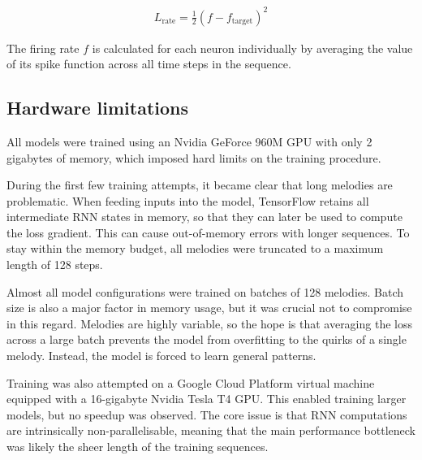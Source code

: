 \documentclass[../../report.tex]{subfiles}
\begin{document}
\begin{align*}
  L_\mathrm{rate} = \frac{1}{2} (f - f_\mathrm{target})^2
\end{align*}

The firing rate \(f\) is calculated for each neuron individually by averaging
the value of its spike function across all time steps in the sequence.

\subsection{Hardware limitations}

All models were trained using an Nvidia GeForce 960M GPU with only 2 gigabytes
of memory, which imposed hard limits on the training procedure.

During the first few training attempts, it became clear that long melodies are
problematic. When feeding inputs into the model, TensorFlow retains all
intermediate RNN states in memory, so that they can later be used to compute the
loss gradient. This can cause out-of-memory errors with longer sequences. To
stay within the memory budget, all melodies were truncated to a maximum length
of 128 steps.

Almost all model configurations were trained on batches of 128 melodies. Batch
size is also a major factor in memory usage, but it was crucial not to
compromise in this regard. Melodies are highly variable, so the hope is that
averaging the loss across a large batch prevents the model from overfitting to
the quirks of a single melody. Instead, the model is forced to learn general
patterns.

Training was also attempted on a Google Cloud Platform virtual machine equipped
with a 16-gigabyte Nvidia Tesla T4 GPU. This enabled training larger models, but
no speedup was observed. The core issue is that RNN computations are
intrinsically non-parallelisable, meaning that the main performance bottleneck
was likely the sheer length of the training sequences.
\end{document}
